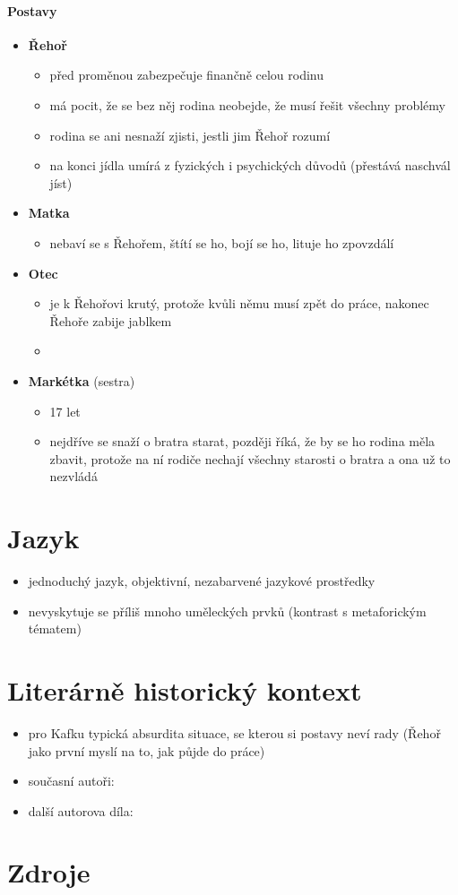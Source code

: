 \documentclass[10pt,a4paper]{article}
\begin{document}
\paragraph{Postavy}
\begin{itemize}
\item \textbf{Řehoř}
	\begin{itemize}
	\item před proměnou zabezpečuje finančně celou rodinu
	\item má pocit, že se bez něj rodina neobejde, že musí řešit všechny problémy
	\item rodina se ani nesnaží zjisti, jestli jim Řehoř rozumí
	\item na konci jídla umírá z fyzických i psychických důvodů (přestává naschvál jíst)
	\end{itemize}
\item \textbf{Matka}
	\begin{itemize}
	\item nebaví se s Řehořem, štítí se ho, bojí se ho, lituje ho zpovzdálí
	\end{itemize}
\item \textbf{Otec}
	\begin{itemize}
	\item je k Řehořovi krutý, protože kvůli němu musí zpět do práce, nakonec Řehoře zabije jablkem
	\item 
	\end{itemize}
\item \textbf{Markétka} (sestra)
	\begin{itemize}
	\item 17 let
	\item nejdříve se snaží o bratra starat, později říká, že by se ho rodina měla zbavit, protože na ní rodiče nechají všechny starosti o bratra a ona už to nezvládá
	
	\end{itemize}
\end{itemize}
\section*{Jazyk}
\begin{itemize}
\item jednoduchý jazyk, objektivní, nezabarvené jazykové prostředky
\item nevyskytuje se příliš mnoho uměleckých prvků (kontrast s metaforickým tématem)
\end{itemize}
\section*{Literárně historický kontext}
\begin{itemize}
\item pro Kafku typická absurdita situace, se kterou si postavy neví rady (Řehoř jako první myslí na to, jak půjde do práce)
\item současní autoři:
\item další autorova díla:
\end{itemize}
\section*{Zdroje}
\end{document}
